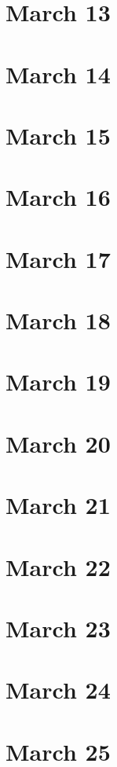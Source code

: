 \section{March 13}

\section{March 14}

\section{March 15}

\section{March 16}

\section{March 17}

\section{March 18}

\section{March 19}

\section{March 20}

\section{March 21}

\section{March 22}

\section{March 23}

\section{March 24}

\section{March 25}

